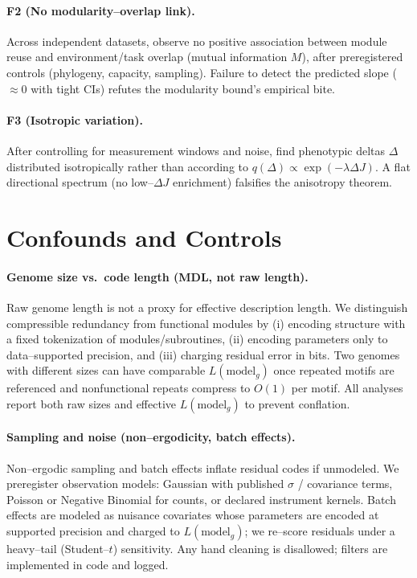 \documentclass[11pt,a4paper]{article}
\begin{document}
\paragraph{F2 (No modularity–overlap link).}
Across independent datasets, observe no positive association between module reuse and environment/task overlap (mutual information $M$), after preregistered controls (phylogeny, capacity, sampling). Failure to detect the predicted slope ($\approx 0$ with tight CIs) refutes the modularity bound’s empirical bite.

\paragraph{F3 (Isotropic variation).}
After controlling for measurement windows and noise, find phenotypic deltas $\Delta$ distributed isotropically rather than according to $q(\Delta)\propto \exp(-\lambda \Delta J)$. A flat directional spectrum (no low–$\Delta J$ enrichment) falsifies the anisotropy theorem.

\section{Confounds and Controls}

\paragraph{Genome size vs.\ code length (MDL, not raw length).}
Raw genome length is not a proxy for effective description length. We distinguish compressible redundancy from functional modules by (i) encoding structure with a fixed tokenization of modules/subroutines, (ii) encoding parameters only to data–supported precision, and (iii) charging residual error in bits. Two genomes with different sizes can have comparable $L(\text{model}_g)$ once repeated motifs are referenced and nonfunctional repeats compress to $O(1)$ per motif. All analyses report both raw sizes and effective $L(\text{model}_g)$ to prevent conflation.

\paragraph{Sampling and noise (non–ergodicity, batch effects).}
Non–ergodic sampling and batch effects inflate residual codes if unmodeled. We preregister observation models: Gaussian with published $\sigma$ / covariance terms, Poisson or Negative Binomial for counts, or declared instrument kernels. Batch effects are modeled as nuisance covariates whose parameters are encoded at supported precision and charged to $L(\text{model}_g)$; we re–score residuals under a heavy–tail (Student–$t$) sensitivity. Any hand cleaning is disallowed; filters are implemented in code and logged.
\end{document}
